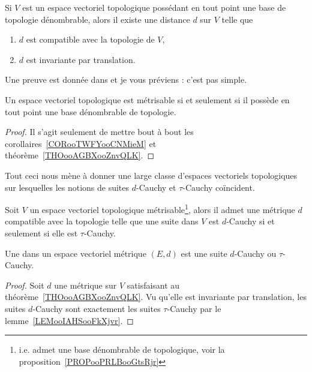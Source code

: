 \begin{theorem}      \label{THOooAGBXooZnvQLK}
    Si $V$ est un espace vectoriel topologique possédant en tout point une base de topologie dénombrable, alors il existe une distance \( d\) sur \( V\) telle que
    \begin{enumerate}
        \item
            \( d\) est compatible avec la topologie de \( V\),
        \item
            \( d\) est invariante par translation.
    \end{enumerate}
\end{theorem}
Une preuve est donnée dans \cite{ooMKWJooLSkGfh} et je vous préviens : c'est pas simple.

\begin{proposition}     \label{PROPooPRLBooGtsRjr}
    Un espace vectoriel topologique est métrisable si et seulement si il possède en tout point une base dénombrable de topologie.
\end{proposition}

\begin{proof}
    Il s'agit seulement de mettre bout à bout les corollaires~\ref{CORooTWFYooCNMieM} et théorème~\ref{THOooAGBXooZnvQLK}.
\end{proof}

Tout ceci nous mène à donner une large classe d'espaces vectoriels topologiques sur lesquelles les notions de suites \( d\)-Cauchy et \( \tau\)-Cauchy coïncident.

\begin{theoremDef}     \label{THOooGQZSooAmQolf}
    Soit \( V\) un espace vectoriel topologique métrisable\footnote{i.e. admet une base dénombrable de topologique, voir la proposition~\ref{PROPooPRLBooGtsRjr}}, alors il admet une métrique \( d\) compatible avec la topologie telle que une suite dans \( V\) est \( d\)-Cauchy si et seulement si elle est \( \tau\)-Cauchy.

    Une  dans un espace vectoriel métrique \( (E,d)\) est une suite \( d\)-Cauchy ou \( \tau\)-Cauchy.
\end{theoremDef}

\begin{proof}
    Soit \( d\) une métrique sur \( V\) satisfaisant au théorème~\ref{THOooAGBXooZnvQLK}. Vu qu'elle est invariante par translation, les suites \( d\)-Cauchy sont exactement les suites \( \tau\)-Cauchy par le lemme~\ref{LEMooIAHSooFkXjvr}.
\end{proof}

